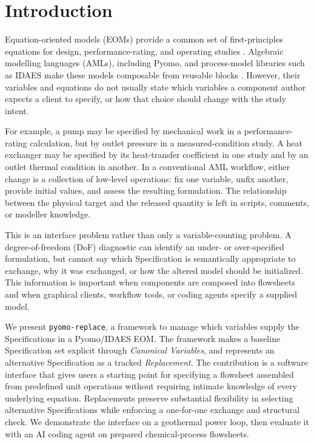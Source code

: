 \documentclass[10pt,letterpaper]{article}
\begin{document}
\psemaketitle

\section{Introduction}
Equation-oriented models (EOMs) provide a common set of first-principles equations for design, performance-rating, and operating studies \cite{shacham1982equation,biegler2010nonlinear}. Algebraic modelling languages (AMLs), including Pyomo, and process-model libraries such as IDAES make these models composable from reusable blocks \cite{hart2011pyomo,lee2021idaes}. However, their variables and equations do not usually state which variables a component author expects a client to specify, or how that choice should change with the study intent.

For example, a pump may be specified by mechanical work in a performance-rating calculation, but by outlet pressure in a measured-condition study. A heat exchanger may be specified by its heat-transfer coefficient in one study and by an outlet thermal condition in another. In a conventional AML workflow, either change is a collection of low-level operations: fix one variable, unfix another, provide initial values, and assess the resulting formulation. The relationship between the physical target and the released quantity is left in scripts, comments, or modeller knowledge.

This is an interface problem rather than only a variable-counting problem. A degree-of-freedom (DoF) diagnostic can identify an under- or over-specified formulation, but cannot say which Specification is semantically appropriate to exchange, why it was exchanged, or how the altered model should be initialized. This information is important when components are composed into flowsheets and when graphical clients, workflow tools, or coding agents specify a supplied model.

We present \texttt{pyomo-replace}, a framework to manage which variables supply the Specifications in a Pyomo/IDAES EOM. The framework makes a baseline Specification set explicit through \emph{Canonical Variables}, and represents an alternative Specification as a tracked \emph{Replacement}. The contribution is a software interface that gives users a starting point for specifying a flowsheet assembled from predefined unit operations without requiring intimate knowledge of every underlying equation. Replacements preserve substantial flexibility in selecting alternative Specifications while enforcing a one-for-one exchange and structural check. We demonstrate the interface on a geothermal power loop, then evaluate it with an AI coding agent on prepared chemical-process flowsheets.
\end{document}
